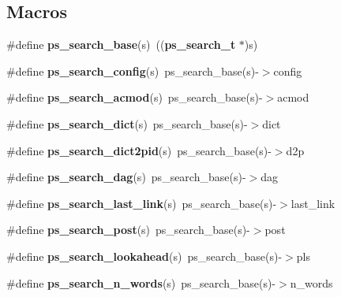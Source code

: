 \subsection*{Macros}
\begin{DoxyCompactItemize}
\item 
\#define {\bfseries ps\-\_\-search\-\_\-base}(s)~(({\bf ps\-\_\-search\-\_\-t} $\ast$)s)\label{pocketsphinx__internal_8h_a27058b099b21336e1fd50299f8596171}

\item 
\#define {\bfseries ps\-\_\-search\-\_\-config}(s)~ps\-\_\-search\-\_\-base(s)-\/$>$config\label{pocketsphinx__internal_8h_a856f984d97ce3d4ac640f1a9061065cf}

\item 
\#define {\bfseries ps\-\_\-search\-\_\-acmod}(s)~ps\-\_\-search\-\_\-base(s)-\/$>$acmod\label{pocketsphinx__internal_8h_a03b1edeb67c83451296c2d99b22621a9}

\item 
\#define {\bfseries ps\-\_\-search\-\_\-dict}(s)~ps\-\_\-search\-\_\-base(s)-\/$>$dict\label{pocketsphinx__internal_8h_ae2aad02cace01fbb2f345a0ead69c672}

\item 
\#define {\bfseries ps\-\_\-search\-\_\-dict2pid}(s)~ps\-\_\-search\-\_\-base(s)-\/$>$d2p\label{pocketsphinx__internal_8h_a5c91d7c3f11ba5b938705d1fe65676f9}

\item 
\#define {\bfseries ps\-\_\-search\-\_\-dag}(s)~ps\-\_\-search\-\_\-base(s)-\/$>$dag\label{pocketsphinx__internal_8h_a90e5addd9875c355d99208246802f7d8}

\item 
\#define {\bfseries ps\-\_\-search\-\_\-last\-\_\-link}(s)~ps\-\_\-search\-\_\-base(s)-\/$>$last\-\_\-link\label{pocketsphinx__internal_8h_a9ae7d942e4206b4184cc073a87d2dc82}

\item 
\#define {\bfseries ps\-\_\-search\-\_\-post}(s)~ps\-\_\-search\-\_\-base(s)-\/$>$post\label{pocketsphinx__internal_8h_ac8707bfd426dfd0eceb1e57836c0ac91}

\item 
\#define {\bfseries ps\-\_\-search\-\_\-lookahead}(s)~ps\-\_\-search\-\_\-base(s)-\/$>$pls\label{pocketsphinx__internal_8h_a890584ac65d28cd404d66adf631fac7c}

\item 
\#define {\bfseries ps\-\_\-search\-\_\-n\-\_\-words}(s)~ps\-\_\-search\-\_\-base(s)-\/$>$n\-\_\-words\label{pocketsphinx__internal_8h_aaba5c849ae487b5a3fff0210f4687e25}


\end{DoxyCompactItemize}
